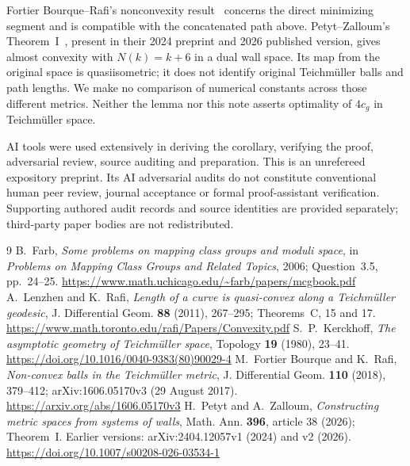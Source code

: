 \documentclass[10pt]{article}
\begin{document}
Fortier Bourque--Rafi's nonconvexity result~\cite{FR} concerns the direct
minimizing segment and is compatible with the concatenated path above.
Petyt--Zalloum's Theorem~I~\cite{PZ}, present in their 2024 preprint and
2026 published version, gives almost convexity with $N(k)=k+6$ in a
dual wall space. Its map from the original space is quasiisometric; it
does not identify original Teichm\"uller balls and path lengths. We make
no comparison of numerical constants across those different metrics.
Neither the lemma nor this note asserts optimality of $4c_g$ in
Teichm\"uller space.

AI tools were used extensively in deriving the corollary, verifying the
proof, adversarial review, source auditing and preparation. This is an
unrefereed expository preprint. Its AI adversarial audits do not constitute
conventional human peer review, journal acceptance or formal proof-assistant
verification. Supporting authored audit records and source identities are
provided separately; third-party paper bodies are not redistributed.

\begin{thebibliography}{9}\small
{} B.~Farb, \emph{Some problems on mapping class groups and
moduli space}, in \emph{Problems on Mapping Class Groups and Related
Topics}, 2006; Question~3.5, pp.~24--25.
\url{https://www.math.uchicago.edu/~farb/papers/mcgbook.pdf}
 A.~Lenzhen and K.~Rafi, \emph{Length of a curve is
quasi-convex along a Teichm\"uller geodesic}, J. Differential Geom.
\textbf{88} (2011), 267--295; Theorems~C, 15 and 17.
\url{https://www.math.toronto.edu/rafi/Papers/Convexity.pdf}
 S.~P.~Kerckhoff, \emph{The asymptotic geometry of
Teichm\"uller space}, Topology \textbf{19} (1980), 23--41.
\url{https://doi.org/10.1016/0040-9383(80)90029-4}
 M.~Fortier Bourque and K.~Rafi, \emph{Non-convex balls in
the Teichm\"uller metric}, J. Differential Geom. \textbf{110} (2018),
379--412; arXiv:1606.05170v3 (29 August 2017).
\url{https://arxiv.org/abs/1606.05170v3}
 H.~Petyt and A.~Zalloum, \emph{Constructing metric spaces
from systems of walls}, Math. Ann. \textbf{396}, article 38 (2026);
Theorem~I. Earlier versions: arXiv:2404.12057v1 (2024) and v2 (2026).
\url{https://doi.org/10.1007/s00208-026-03534-1}
\end{thebibliography}
\end{document}
